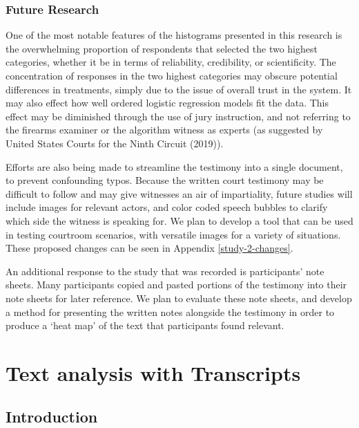 \documentclass[print]{nuthesis}
\begin{document}
\hypertarget{future-research}{%
\subsection{Future Research}\label{future-research}}

One of the most notable features of the histograms presented in this research is the overwhelming proportion of respondents that selected the two highest categories, whether it be in terms of reliability, credibility, or scientificity.
The concentration of responses in the two highest categories may obscure potential differences in treatments, simply due to the issue of overall trust in the system.
It may also effect how well ordered logistic regression models fit the data.
This effect may be diminished through the use of jury instruction, and not referring to the firearms examiner or the algorithm witness as experts (as suggested by United States Courts for the Ninth Circuit (2019)).

Efforts are also being made to streamline the testimony into a single document, to prevent confounding typos.
Because the written court testimony may be difficult to follow and may give witnesses an air of impartiality, future studies will include images for relevant actors, and color coded speech bubbles to clarify which side the witness is speaking for.
We plan to develop a tool that can be used in testing courtroom scenarios, with versatile images for a variety of situations. These proposed changes can be seen in Appendix \ref{study-2-changes}.

An additional response to the study that was recorded is participants' note sheets.
Many participants copied and pasted portions of the testimony into their note sheets for later reference.
We plan to evaluate these note sheets, and develop a method for presenting the written notes alongside the testimony in order to produce a `heat map' of the text that participants found relevant.

\hypertarget{textcolor}{%
\chapter{Text analysis with Transcripts}\label{textcolor}}

\hypertarget{introduction-1}{%
\section{Introduction}\label{introduction-1}}
\end{document}
